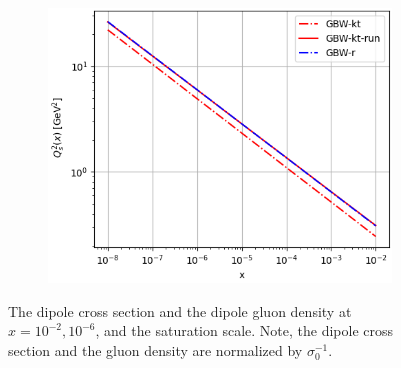 \documentclass[12pt]{article}
\numberwithin{equation}{section}
\numberwithin{table}{section}
\numberwithin{figure}{section}
\newcommand{\comment}[1]{\texttt{\color{red}#1}}
\begin{document}
\begin{figure}[t]
\begin{subfigure}{0.47\textwidth}
\includegraphics[width=\textwidth]{./plots/GBW-saturation.png}
\end{subfigure}
\caption{The dipole cross section and the dipole gluon density at
$x=10^{-2}, 10^{-6}$, and the saturation scale. 
Note, the dipole cross section and the gluon density are normalized by $\sigma_0^{-1}$.
}
\label{fig:GBW}
\end{figure}
\end{document}
